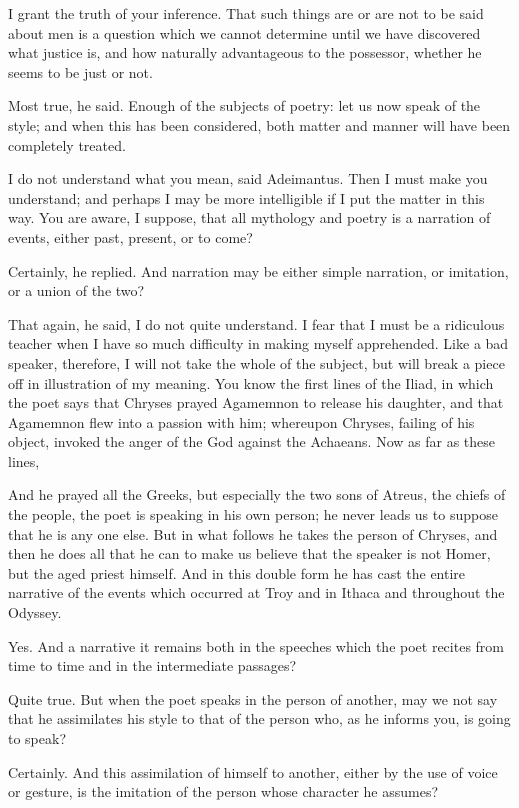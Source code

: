 I grant the truth of your inference.
That such things are or are not to be said about men is a question which we cannot determine until we have discovered what justice is, and how naturally advantageous to the possessor, whether he seems to be just or not.

Most true, he said.
Enough of the subjects of poetry: let us now speak of the style; and when this has been considered, both matter and manner will have been completely treated.

I do not understand what you mean, said Adeimantus.
Then I must make you understand; and perhaps I may be more intelligible if I put the matter in this way. You are aware, I suppose, that all mythology and poetry is a narration of events, either past, present, or to come?

Certainly, he replied.
And narration may be either simple narration, or imitation, or a union of the two?

That again, he said, I do not quite understand.
I fear that I must be a ridiculous teacher when I have so much difficulty in making myself apprehended. Like a bad speaker, therefore, I will not take the whole of the subject, but will break a piece off in illustration of my meaning. You know the first lines of the Iliad, in which the poet says that Chryses prayed Agamemnon to release his daughter, and that Agamemnon flew into a passion with him; whereupon Chryses, failing of his object, invoked the anger of the God against the Achaeans. Now as far as these lines,

And he prayed all the Greeks, but especially the two sons of Atreus, the chiefs of the people, the poet is speaking in his own person; he never leads us to suppose that he is any one else. But in what follows he takes the person of Chryses, and then he does all that he can to make us believe that the speaker is not Homer, but the aged priest himself. And in this double form he has cast the entire narrative of the events which occurred at Troy and in Ithaca and throughout the Odyssey.

Yes.
And a narrative it remains both in the speeches which the poet recites from time to time and in the intermediate passages?

Quite true.
But when the poet speaks in the person of another, may we not say that he assimilates his style to that of the person who, as he informs you, is going to speak?

Certainly.
And this assimilation of himself to another, either by the use of voice or gesture, is the imitation of the person whose character he assumes?

